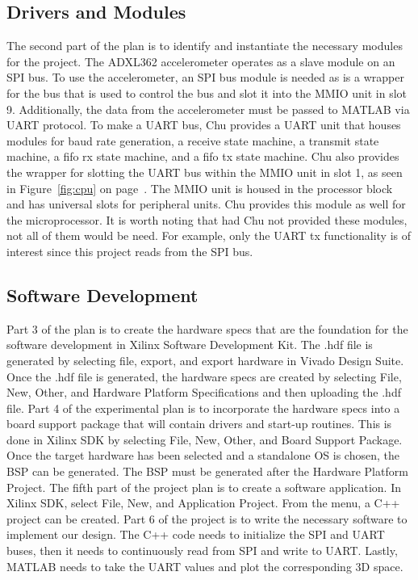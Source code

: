 \documentclass{article}
\begin{document}
\subsection{Drivers and Modules}
The second part of the plan is to identify and instantiate the necessary modules for the project. The ADXL362 accelerometer operates as a slave module on an SPI bus. To use the accelerometer, an SPI bus module is needed as is a wrapper for the bus that is used to control the bus and slot it into the MMIO unit in slot 9. Additionally, the data from the accelerometer must be passed to MATLAB via UART protocol. To make a UART bus, Chu provides a UART unit that houses modules for baud rate generation, a receive state machine, a transmit state machine, a fifo rx state machine, and a fifo tx state machine. Chu also provides the wrapper for slotting the UART bus within the MMIO unit in slot 1, as seen in Figure~\ref{fig:cpu} on page~\pageref{fig:cpu}. The MMIO unit is housed in the processor block and has universal slots for peripheral units. Chu provides this module as well for the microprocessor. It is worth noting that had Chu not provided these modules, not all of them would be need. For example, only the UART tx functionality is of interest since this project reads from the SPI bus. 
\subsection{Software Development}
Part 3 of the plan is to create the hardware specs that are the foundation for the software development in Xilinx Software Development Kit. The .hdf file is generated by selecting file, export, and export hardware in Vivado Design Suite. Once the .hdf file is generated, the hardware specs are created by selecting File, New, Other, and Hardware Platform Specifications and then uploading the .hdf file. Part 4 of the experimental plan is to incorporate the hardware specs into a board support package that will contain drivers and start-up routines. This is done in Xilinx SDK by selecting File, New, Other, and Board Support Package. Once the target hardware has been selected and a standalone OS is chosen, the BSP can be generated. The BSP must be generated after the Hardware Platform Project. The fifth part of the project plan is to create a software application. In Xilinx SDK, select File, New, and Application Project. From the menu, a C++ project can be created. Part 6 of the project is to write the necessary software to implement our design. The C++ code needs to initialize the SPI and UART buses, then it needs to continuously read from SPI and write to UART. Lastly, MATLAB needs to take the UART values and plot the corresponding 3D space. 
\end{document}
